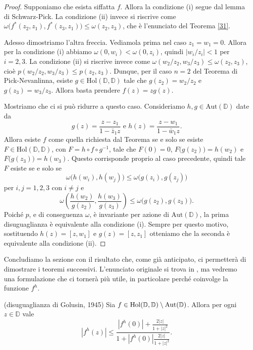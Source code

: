 \begin{proof}
  Supponiamo che esista siffatta $f$. Allora la condizione (i) segue dal lemma di Schwarz-Pick. La condizione (ii) invece si riscrive come $\omega\bigl(f^*(z_2,z_1),f^*(z_3,z_1)\bigr) \le \omega(z_2,z_3)$, che è l'enunciato del Teorema \ref{31}.

  Adesso dimostriamo l'altra freccia. Vediamola prima nel caso $z_1=w_1=0$. Allora per la condizione (i) abbiamo $\omega(0,w_i) < \omega(0,z_i)$, quindi $|w_i/z_i|<1$ per $i=2,3$. La condizione (ii) si riscrive invece come $\omega(w_2/z_2,w_3/z_3) \le \omega(z_2,z_3)$, cioè $p(w_2/z_2,w_3/z_3) \le p(z_2,z_3)$.
  Dunque, per il caso $n=2$ del Teorema di Pick-Nevanlinna, esiste $g \in \text{Hol}(\mathbb{D},\mathbb{D})$ tale che $g(z_2)=w_2/z_2$ e $g(z_3)=w_3/z_3$. Allora basta prendere $f(z)=zg(z)$.

   Mostriamo che ci si può ridurre a questo caso. Consideriamo $h, g \in \text{Aut}(\mathbb{D})$ date da
   $$g(z)=\frac{z-z_1}{1-\bar{z}_1z} \text{ e } h(z)=\frac{z-w_1}{1-\bar{w}_1z}.$$
   Allora esiste $f$ come quella richiesta dal Teorema se e solo se esiste $F \in \text{Hol}(\mathbb{D},\mathbb{D})$, con $F=h \circ f \circ g^{-1}$, tale che $F(0)=0$, $F\bigl(g(z_2)\bigr)=h(w_2)$ e $F\bigl(g(z_3)\bigr)=h(w_3)$.
   Questo corrisponde proprio al caso precedente, quindi tale $F$ esiste se e solo se
   $$\omega\bigl(h(w_i),h(w_j)\bigr) \le \omega\bigl(g(z_i),g(z_j)\bigr)$$
   per $i,j=1,2,3$ con $i\not=j$ e
   $$\omega\left(\frac{h(w_2)}{g(z_2)},\frac{h(w_3)}{g(z_3)}\right) \le \omega\bigl(g(z_2),g(z_3)\bigr).$$
   Poiché $p$, e di conseguenza $\omega$, è invariante per azione di $\text{Aut}(\mathbb{D})$, la prima disuguaglianza è equivalente alla condizione (i). Sempre per questo motivo, sostituendo $h(z)=[z,w_1]$ e $g(z)=[z,z_1]$ otteniamo che la seconda è equivalente alla condizione (ii).
\end{proof}

Concludiamo la sezione con il risultato che, come già anticipato, ci permetterà di dimostrare i teoremi successivi. L'enunciato originale si trova in \cite{GMG}, ma vedremo una formulazione che ci tornerà più utile, in particolare perché coinvolge la funzione $f^h$.

\begin{thm} \label{golusin}
  (disuguaglianza di Golusin, 1945) Sia $f \in \text{\normalfont{Hol}}(\mathbb{D},\mathbb{D})\setminus\text{\normalfont{Aut}}(\mathbb{D})$. Allora per ogni $z \in \mathbb{D}$ vale
  \begin{equation} \label{gol}
    |f^h(z)| \le \frac{|f^h(0)|+\frac{2|z|}{1+|z|^2}}{1+|f^h(0)|\frac{2|z|}{1+|z|^2}}.
  \end{equation}
\end{thm}

